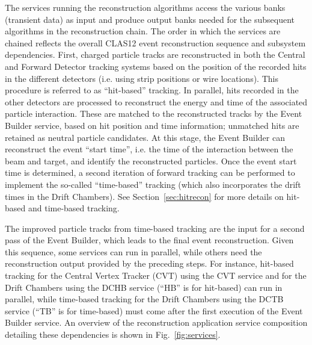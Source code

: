 The services running the reconstruction algorithms access the various banks (transient data) as input and produce
output banks needed for the subsequent algorithms in the reconstruction chain. The order in which the services are
chained reflects the overall CLAS12 event reconstruction sequence and subsystem dependencies. First, charged
particle tracks are reconstructed in both the Central and Forward Detector tracking systems based on the position
of the recorded hits in the different detectors (i.e. using strip positions or wire locations). This procedure is
referred to as ``hit-based'' tracking. In parallel, hits recorded in the other detectors are processed to reconstruct
the energy and time of the associated particle interaction. These are matched to the reconstructed tracks by the
Event Builder service, based {\color{red} on hit position and time information}; unmatched hits are retained as neutral particle
candidates. At this stage, the Event Builder can reconstruct the event ``start time'', i.e. the time of the interaction
between the beam and target, and identify the reconstructed particles. Once the event start time is determined, a
second iteration of forward tracking can be performed to implement the so-called ``time-based'' tracking (which
also incorporates the drift times in the Drift Chambers). See Section~\ref{sec:hitrecon} for more details on
hit-based and time-based tracking.

The improved particle tracks from time-based tracking are the input for a second pass of the Event Builder, which
leads to the final event reconstruction. Given this sequence, some services can run in parallel, while others need the
reconstruction output provided by the preceding steps. For instance, hit-based tracking for the Central Vertex
Tracker (CVT) using the CVT service and for the Drift Chambers using the DCHB service (``HB'' is for hit-based)
can run in parallel, while time-based tracking for the Drift Chambers using the DCTB service {\color{red} (``TB'' is for time-based)}
must come after the first execution of the Event Builder service. An overview of the reconstruction application service
composition detailing these dependencies is shown in Fig.~\ref{fig:services}.
